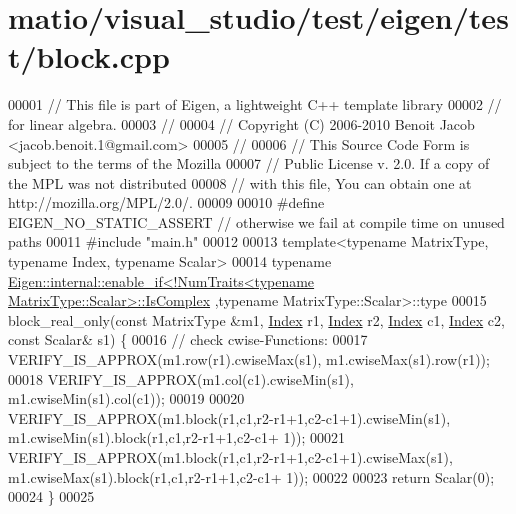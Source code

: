 \hypertarget{matio_2visual__studio_2test_2eigen_2test_2block_8cpp_source}{}\section{matio/visual\+\_\+studio/test/eigen/test/block.cpp}
\label{matio_2visual__studio_2test_2eigen_2test_2block_8cpp_source}

\begin{DoxyCode}
00001 \textcolor{comment}{// This file is part of Eigen, a lightweight C++ template library}
00002 \textcolor{comment}{// for linear algebra.}
00003 \textcolor{comment}{//}
00004 \textcolor{comment}{// Copyright (C) 2006-2010 Benoit Jacob <jacob.benoit.1@gmail.com>}
00005 \textcolor{comment}{//}
00006 \textcolor{comment}{// This Source Code Form is subject to the terms of the Mozilla}
00007 \textcolor{comment}{// Public License v. 2.0. If a copy of the MPL was not distributed}
00008 \textcolor{comment}{// with this file, You can obtain one at http://mozilla.org/MPL/2.0/.}
00009 
00010 \textcolor{preprocessor}{#define EIGEN\_NO\_STATIC\_ASSERT // otherwise we fail at compile time on unused paths}
00011 \textcolor{preprocessor}{#include "main.h"}
00012 
00013 \textcolor{keyword}{template}<\textcolor{keyword}{typename} MatrixType, \textcolor{keyword}{typename} Index, \textcolor{keyword}{typename} Scalar>
00014 \textcolor{keyword}{typename} 
      \hyperlink{struct_eigen_1_1internal_1_1enable__if}{Eigen::internal::enable\_if<!NumTraits<typename MatrixType::Scalar>::IsComplex}
      ,\textcolor{keyword}{typename} MatrixType::Scalar>::type
00015 block\_real\_only(\textcolor{keyword}{const} MatrixType &m1, \hyperlink{namespace_eigen_a62e77e0933482dafde8fe197d9a2cfde}{Index} r1, \hyperlink{namespace_eigen_a62e77e0933482dafde8fe197d9a2cfde}{Index} r2, \hyperlink{namespace_eigen_a62e77e0933482dafde8fe197d9a2cfde}{Index} c1, 
      \hyperlink{namespace_eigen_a62e77e0933482dafde8fe197d9a2cfde}{Index} c2, \textcolor{keyword}{const} Scalar& s1) \{
00016   \textcolor{comment}{// check cwise-Functions:}
00017   VERIFY\_IS\_APPROX(m1.row(r1).cwiseMax(s1), m1.cwiseMax(s1).row(r1));
00018   VERIFY\_IS\_APPROX(m1.col(c1).cwiseMin(s1), m1.cwiseMin(s1).col(c1));
00019 
00020   VERIFY\_IS\_APPROX(m1.block(r1,c1,r2-r1+1,c2-c1+1).cwiseMin(s1), m1.cwiseMin(s1).block(r1,c1,r2-r1+1,c2-c1+
      1));
00021   VERIFY\_IS\_APPROX(m1.block(r1,c1,r2-r1+1,c2-c1+1).cwiseMax(s1), m1.cwiseMax(s1).block(r1,c1,r2-r1+1,c2-c1+
      1));
00022   
00023   \textcolor{keywordflow}{return} Scalar(0);
00024 \}
00025 

\end{DoxyCode}
